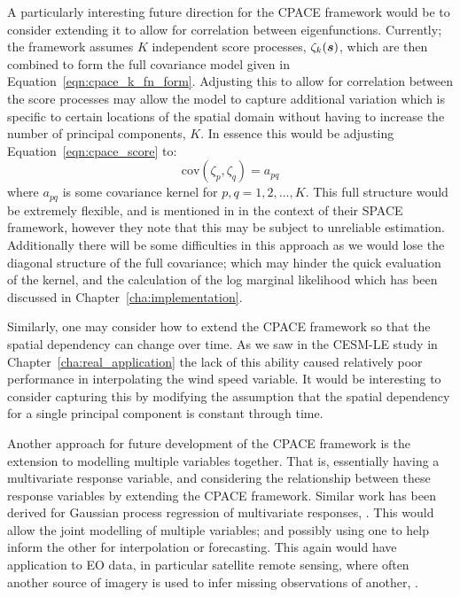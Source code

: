 A particularly interesting future direction for the CPACE framework would be to consider extending it to allow for correlation between eigenfunctions.	
Currently; the framework assumes $K$ independent score processes, $\zeta_k(\bm{{s}})$, which are then combined to form the full covariance model given in Equation~\eqref{eqn:cpace_k_fn_form}.
Adjusting this to allow for correlation between the score processes may allow the model to capture additional variation which is specific to certain locations of the spatial domain without having to increase the number of principal components, $K$.
In essence this would be adjusting Equation~\eqref{eqn:cpace_score} to: 
\begin{equation}
	\text{cov}\left(\zeta_p, \zeta_q \right) = a_{pq}
\end{equation}
where $a_{pq}$ is some covariance kernel for $p, q = 1, 2, \dots, K$.
This full structure would be extremely flexible, and is mentioned in \citep{liu_functional_2017} in the context of their SPACE framework, however they note that this may be subject to unreliable estimation.
Additionally there will be some difficulties in this approach as we would lose the diagonal structure of the full covariance; which may hinder the quick evaluation of the kernel, and the calculation of the log marginal likelihood which has been discussed in Chapter~\ref{cha:implementation}.

Similarly, one may consider how to extend the CPACE framework so that the spatial dependency can change over time. 
As we saw in the CESM-LE study in Chapter~\ref{cha:real_application} the lack of this ability caused relatively poor performance in interpolating the wind speed variable. 
It would be interesting to consider capturing this by modifying the assumption that the spatial dependency for a single principal component is constant through time. 

Another approach for future development of the CPACE framework is the extension to modelling multiple variables together.
That is, essentially having a multivariate response variable, and considering the relationship between these response variables by extending the CPACE framework.
Similar work has been derived for Gaussian process regression of multivariate responses, \citep{chen_multivariate_2020}.
This would allow the joint modelling of multiple variables; and possibly using one to help inform the other for interpolation or forecasting.
This again would have application to EO data, in particular satellite remote sensing, where often another source of imagery is used to infer missing observations of another, \citep{meraner_cloud_2020}.


